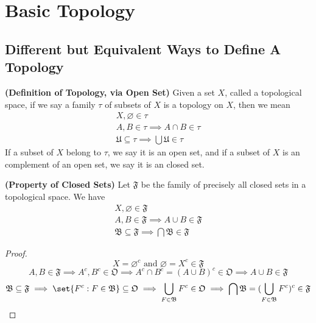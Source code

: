 \documentclass{report}
\begin{document}
\chapter{Basic Topology} 
\section{Different but Equivalent Ways to Define A Topology}
\begin{definition}
\label{2.1.1}
\textbf{(Definition of Topology, via Open Set)} Given a set $X$, called a topological space, if we say a family $\tau$  of subsets of $X$ is a topology on $X$, then we mean
\begin{gather*}
X, \varnothing \in \tau\\
A,B\in\tau\implies A\cap B\in\tau\\
\mathfrak{U}\subseteq \tau\implies \bigcup \mathfrak{U}\in \tau
\end{gather*}
If a subset of $X$ belong to  $\tau$, we say it is an open set, and if a subset of $X$ is an complement of an open set, we say it is an closed set.
\end{definition}
\begin{theorem}
\label{2.1.2}
\textbf{(Property of Closed Sets)} Let $\mathfrak{F}$ be the family of precisely all closed sets in a topological space. We have
\begin{gather*}
X,\varnothing \in \mathfrak{F}\\
A,B\in\mathfrak{F}\implies A\cup  B\in\mathfrak{F}\\
\mathfrak{B}\subseteq \mathfrak{F}\implies \bigcap \mathfrak{B}\in \mathfrak{F}
\end{gather*}
\end{theorem}
\begin{proof}
\begin{equation*}
X=\varnothing^c\text{ and }\varnothing=X^c\in \mathfrak{F}
\end{equation*}
\begin{equation*}
A,B\in \mathfrak{F}\implies A^c,B^c \in \mathfrak{O}\implies A^c \cap B^c=(A\cup B)^c \in \mathfrak{O} \implies A\cup  B \in \mathfrak{F}
\end{equation*}
\begin{equation*}
\mathfrak{B}\subseteq \mathfrak{F}\implies \set{F^c:F \in \mathfrak{B}}\subseteq \mathfrak{O}\implies \bigcup_{F\in \mathfrak{B}}F^c \in \mathfrak{O}\implies \bigcap \mathfrak{B}= (\bigcup_{F \in\mathfrak{B}} F^c)^c \in \mathfrak{F}
\end{equation*}
\end{proof}
\end{document}
